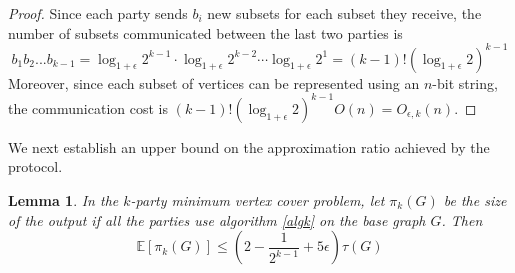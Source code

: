 \documentclass[11pt]{article}
\newtheorem{lemma}[theorem]{Lemma}
\newcommand{\E}[0]{\ensuremath{\mathbb{E}}}
\newcommand{\mvc}[1]{\tau\left(#1 \right)}
\begin{document}
\begin{proof}
    Since each party sends $b_i$ new subsets for each subset they receive, the number of subsets communicated between the last two parties is 
    \[b_1 b_2 ... b_{k-1} = \log_{1 + \epsilon}2^{k-1} \cdot \log_{1 + \epsilon} 2^{k-2} \cdots \log_{1 + \epsilon} 2^{1} = (k-1)! (\log_{1 + \epsilon} 2)^{k-1}\]
    Moreover, since each subset of vertices can be represented using an $n$-bit string, the communication cost is $(k-1)! (\log_{1 + \epsilon}2)^{k-1} O(n) = O_{\epsilon, k} (n)$.
\end{proof}

We next establish an upper bound on the approximation
ratio achieved by the protocol.

\begin{lemma}
\label{lemma:approximation}
  In the $k$-party minimum vertex cover problem, 
let $\pi_{k}(G)$ be the size of the output if all the parties use algorithm \ref{algk} on the base graph $G$.
     Then \[\E [\pi_k(G) ] \leq (2 - \frac{1}{2^{k-1}} + 5 \epsilon) \mvc{G}\]
\end{lemma}
\end{document}
